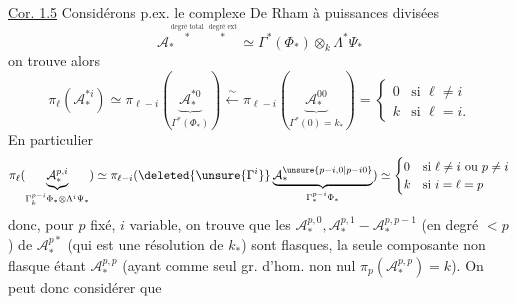 \uline{Cor. 1.5}
Considérons p.ex. le complexe 
De Rham à puissances divisées
\[
\mathcal A_*^{\overset{\text{degré total}}{*}\,\overset{\text{degré ext}}{*}}
\simeq\Gamma^*(\Phi_*)\otimes_k\Lambda^*\Psi_*
\]
on trouve alors
\[
\pi_\ell(\mathcal A_*^{*i})\simeq
\pi_{\ell-i}(\underbrace{\mathcal A_*^{*0}}_{\Gamma^*(\Phi_*)})
\xleftarrow{\sim}\pi_{\ell-i}(\underbrace{\mathcal A_*^{00}}_{\Gamma^*(0)=k_*})
=\begin{cases}0&\text{si }\ell\ne i\\k&\text{si }\ell=i.\end{cases}
\]
En  particulier
\[
\pi_\ell(\underbrace{\mathcal A_*^{p,i}}_{\Gamma_k^{p-i}\Phi_*\otimes\Lambda^i\Psi_*})
\simeq\pi_{\ell-i}(\deleted{\unsure{\Gamma^i}}
\underbrace{\mathcal A_*^{\unsure{p-i,0|p-i0}}}_{\Gamma_*^{p-i}\Phi_*})
\simeq\begin{cases}0&\text{si }\ell\ne i\text{ ou }p\ne i\\k&\text{si }i=\ell=p\end{cases}
\]
donc, pour $p$ fixé, $i$ variable, on trouve que les 
$\mathcal A_*^{p,0},\mathcal A_*^{p,1}\mathbin{-}\mathcal A_*^{p,p-1}$
 (en degré $<p$) de $\mathcal A_*^{p*}$ 
(qui est une résolution de $k_*$) sont flasques, la seule composante non flasque étant
$\mathcal A_*^{p,p}$ (ayant comme seul gr. d'hom. non nul
$\pi_p(\mathcal A_*^{p,p})=k$). On peut donc considérer que

